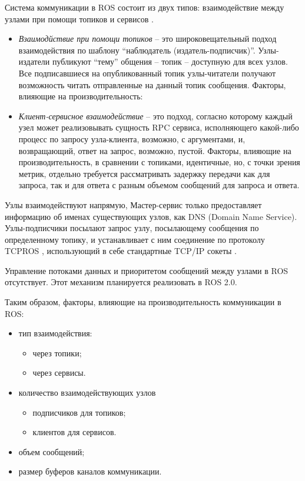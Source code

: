 Система коммуникации в ROS состоит из двух типов: взаимодействие между узлами при помощи топиков и сервисов \cite{o2014gentle}.

\begin{itemize}[noitemsep]
	\item \textit{Взаимодйствие при помощи топиков} -- это широковещательный подход взаимодействия по шаблону \enquote{наблюдатель (издатель-подписчик)}. Узлы-издатели публикуют \enquote{тему} общения -- топик -- доступную для всех узлов. Все подписавшиеся на опубликованный топик узлы-читатели получают возможность читать отправленные на данный топик сообщения. Факторы, влияющие на производительность:

	\item \textit{Клиент-сервисное взаимодействие} -- это подход, согласно которому каждый узел может реализовывать сущность RPC сервиса, исполняющего какой-либо процесс по запросу узла-клиента, возможно, с аргументами, и, возвращающий, ответ на запрос, возможно, пустой. Факторы, влияющие на производительность, в сравнении с топиками, идентичные, но, с точки зрения метрик, отдельно требуется рассматривать задержку передачи как для запроса, так и для ответа с разным объемом сообщений для запроса и ответа.
\end{itemize}

Узлы взаимодействуют напрямую, Мастер-сервис только предоставляет информацию об именах существующих узлов, как DNS (Domain Name Service). Узлы-подписчики посылают запрос узлу, посылающему сообщения по определенному топику, и устанавливает с ним соединение по протоколу TCPROS \cite{ros-tcpros}, использующий в себе стандартные TCP/IP сокеты \cite{ros-concepts}.

Управление потоками данных и приоритетом сообщений между узлами в ROS отсутствует. Этот механизм планируется реализовать в ROS 2.0.

Таким образом, факторы, влияющие на производительность коммуникации в ROS:
\begin{itemize}[noitemsep]
	\item тип взаимодействия:
	\begin{itemize}[noitemsep]
		\item через топики;
		\item через сервисы.
	\end{itemize}
	\item количество взаимодействующих узлов
	\begin{itemize}[noitemsep]
		\item подписчиков для топиков;
		\item клиентов для сервисов.
	\end{itemize}
	\item объем сообщений;
	\item размер буферов каналов коммуникации.
\end{itemize}